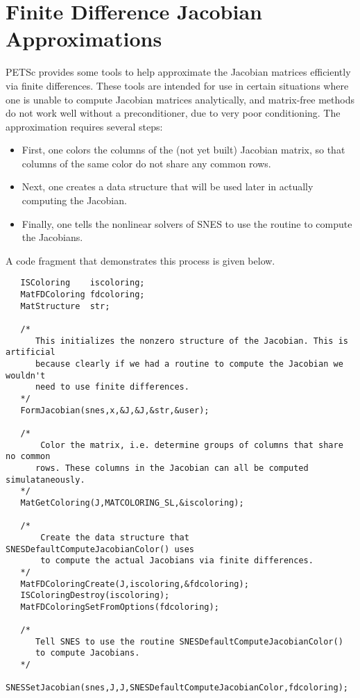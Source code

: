 \section{Finite Difference Jacobian Approximations}
\label{sec:fdmatrix}

PETSc provides some tools to help approximate the Jacobian matrices efficiently via 
finite differences.  These tools are intended for use in certain situations where
one is unable to compute Jacobian matrices analytically, and matrix-free methods
do not work well without a preconditioner, due to very poor conditioning.  
The approximation requires several steps:
\begin{itemize}
\item First, one colors the columns of the (not yet built) Jacobian matrix, so that 
      columns of the same color do not share any common rows.
\item Next, one creates a  data structure that will be used later in 
      actually computing the Jacobian. 
\item Finally, one tells the nonlinear solvers of SNES to use the
      routine to compute the Jacobians. 
\end{itemize}
A code fragment that demonstrates this process is given below.
\begin{verbatim}
   ISColoring    iscoloring;
   MatFDColoring fdcoloring;
   MatStructure  str;

   /* 
      This initializes the nonzero structure of the Jacobian. This is artificial
      because clearly if we had a routine to compute the Jacobian we wouldn't
      need to use finite differences.
   */
   FormJacobian(snes,x,&J,&J,&str,&user);

   /*
       Color the matrix, i.e. determine groups of columns that share no common 
      rows. These columns in the Jacobian can all be computed simulataneously.
   */
   MatGetColoring(J,MATCOLORING_SL,&iscoloring);

   /*
       Create the data structure that SNESDefaultComputeJacobianColor() uses
       to compute the actual Jacobians via finite differences.
   */
   MatFDColoringCreate(J,iscoloring,&fdcoloring);
   ISColoringDestroy(iscoloring);
   MatFDColoringSetFromOptions(fdcoloring);

   /*
      Tell SNES to use the routine SNESDefaultComputeJacobianColor()
      to compute Jacobians.
   */
   SNESSetJacobian(snes,J,J,SNESDefaultComputeJacobianColor,fdcoloring);

\end{verbatim}

